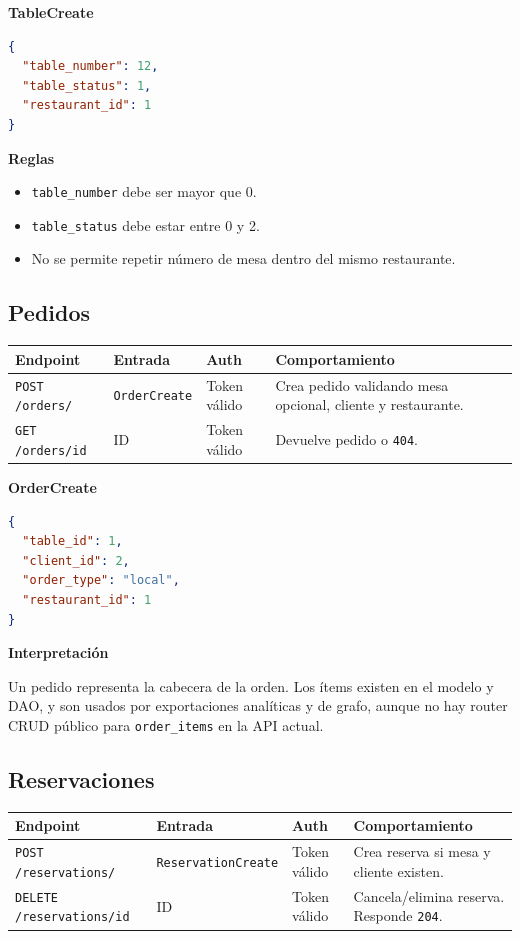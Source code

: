 \documentclass[12pt,letterpaper]{article}
\def\endpoint#1#2{\texttt{#1 #2}}
\def\codefile#1{\nolinkurl{#1}}
\begin{document}
\textbf{TableCreate}
\begin{lstlisting}[language=json]
{
  "table_number": 12,
  "table_status": 1,
  "restaurant_id": 1
}
\end{lstlisting}

\textbf{Reglas}
\begin{itemize}
    \item \codefile{table\_number} debe ser mayor que 0.
    \item \codefile{table\_status} debe estar entre 0 y 2.
    \item No se permite repetir número de mesa dentro del mismo restaurante.
\end{itemize}

\subsection{Pedidos}

\begin{longtable}{p{}p{}p{}p{}}
\toprule
\textbf{Endpoint} & \textbf{Entrada} & \textbf{Auth} & \textbf{Comportamiento}\\
\midrule
\endpoint{POST}{/orders/} & \codefile{OrderCreate} & Token válido & Crea pedido validando mesa opcional, cliente y restaurante.\\
\endpoint{GET}{/orders/{id}} & ID & Token válido & Devuelve pedido o \codefile{404}.\\
\bottomrule
\end{longtable}

\textbf{OrderCreate}
\begin{lstlisting}[language=json]
{
  "table_id": 1,
  "client_id": 2,
  "order_type": "local",
  "restaurant_id": 1
}
\end{lstlisting}

\textbf{Interpretación}

Un pedido representa la cabecera de la orden. Los ítems existen en el modelo y DAO, y son usados por exportaciones analíticas y de grafo, aunque no hay router CRUD público para \codefile{order\_items} en la API actual.

\subsection{Reservaciones}

\begin{longtable}{p{}p{}p{}p{}}
\toprule
\textbf{Endpoint} & \textbf{Entrada} & \textbf{Auth} & \textbf{Comportamiento}\\
\midrule
\endpoint{POST}{/reservations/} & \codefile{ReservationCreate} & Token válido & Crea reserva si mesa y cliente existen.\\
\endpoint{DELETE}{/reservations/{id}} & ID & Token válido & Cancela/elimina reserva. Responde \codefile{204}.\\
\bottomrule
\end{longtable}
\end{document}
